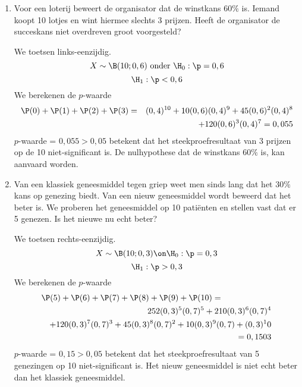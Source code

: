 {\begin{enumerate}
Maar krijgen we enkel de eerste 14 cijfers dan zijn er slechts 4 cijfers even. 
$$\pi= 3,14159265358979$$
We toetsen tweezijdig.
$$X\sim\B(14;1/2)\mbox{ onder } \H_0:\p=0,5$$ 
$$\H_1:\p\not= 0,5$$

We berekenen de $p$-waarde:\\
$$\P(0)+\P(1)+\P(2)+\P(3)+\P(4)$$
$$=(0,5)^{14}(1+14+91+364+1001)=\frac{1471}{2^{14}}=0,0897$$
$p$-waarde = $0,0897>0,25$ betekent dat het steekproefresultaat van slechts 4 even cijfers op de 14 niet significant is. De nulhypothese dat er evenveel even als oneven decimalen zijn in het getal $\pi$ mag niet verworpen worden.

$$\P(0)+\P(1)+\P(2)+\P(3)=\P(12)+\P(13)+\P(14)=0,02868>0,025.$$
Hieruit besluiten we dat de uitkomsten die liggen in het significantiegebied 
met significatieniveau $\alpha= 0,05$ de uitkomsten 0, 1, 2, 12, 13 en 14 zijn.



\item Voor een loterij beweert de organisator dat de winstkans $60\%$ is. 
Iemand 
koopt 10 lotjes en wint hiermee slechts 3 prijzen. Heeft de organisator de 
succeskans niet overdreven groot voorgesteld?

 We toetsen links-eenzijdig.
 $$X\sim\B(10;0,6)\mbox{ onder }\H_0:\p=0,6$$
 $$\H_1:\p<0,6$$
We berekenen de $p$-waarde
\begin{eqnarray*}
\P(0)+\P(1)+\P(2)+\P(3)&=&(0,4)^{10}+10(0,6)(0,4)^{9}+45(0,6)^2(0,4)^8\\
                   & & +120(0,6)^3(0,4)^7=0,055
\end{eqnarray*}                   
$p$-waarde = $0,055>0,05$ betekent dat het steekproefresultaat van 3 prijzen op de 10
 niet-significant is. De nulhypothese dat de winstkans $60\%$ is, kan aanvaard 
worden.

\item Van een klassiek geneesmiddel tegen griep weet men sinds lang dat 
het $30\%$ kans op genezing biedt. Van een nieuw geneesmiddel wordt beweerd dat 
het beter is. We proberen het geneesmiddel op 10 pati\"enten en stellen vast 
dat er 5 genezen. Is het nieuwe nu echt beter?

We toetsen rechts-eenzijdig.
$$X\sim\B(10;0,3)\on\H_0:\p=0,3$$
$$\H_1:\p>0,3$$
We berekenen de $p$-waarde
\begin{eqnarray*}
\lefteqn{\P(5)+\P(6)+\P(7)+\P(8)+\P(9)+\P(10) =}\\ 
 & & 252(0,3)^5(0,7)^5+210(0,3)^6(0,7)^4\\
 & & +120(0,3)^7(0,7)^3+45(0,3)^8(0,7)^2+10(0,3)^9(0,7)+(0,3)^10\\
& & = 0,1503 
\end{eqnarray*}
$p$-waarde = $0,15> 0,05$ betekent dat het steekproefresultaat van 5 genezingen op 10 
niet-significant is. Het nieuw geneesmiddel is niet echt beter dan het klassiek
geneesmiddel.


\end{enumerate}}

